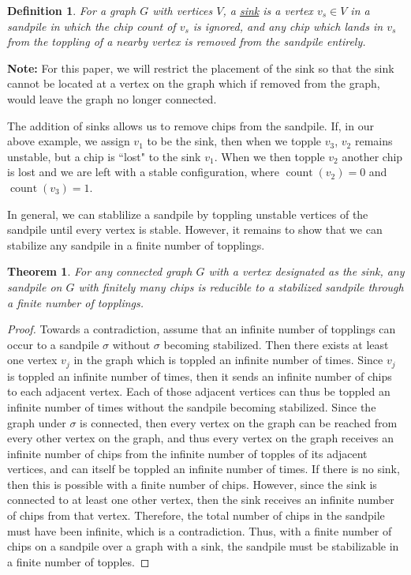 \documentclass[12pt]{article}
\DeclareMathOperator{\ct}{count}
\newtheorem{theorem}{Theorem}
\newtheorem{definition}{Definition}
\begin{document}
\begin{definition}
    For a graph $G$ with vertices $V$, a \underline{sink} is a vertex $v_s \in V$ in a sandpile in which the chip count of $v_s$ is ignored, and any chip which lands in $v_s$ from the toppling of a nearby vertex is removed from the sandpile entirely.
\end{definition}

\textbf{Note:}  For this paper, we will restrict the placement of the sink so that the sink cannot be located at a vertex on the graph which if removed from the graph, would leave the graph no longer connected.  %

The addition of sinks allows us to remove chips from the sandpile.  If, in our above example, we assign $v_1$ to be the sink, then when we topple $v_3$, $v_2$ remains unstable, but a chip is ``lost" to the sink $v_1$.  When we then topple $v_2$ another chip is lost and we are left with a stable configuration, where $\ct(v_2)=0$ and $\ct(v_3)=1$.

In general, we can stablilize a sandpile by toppling unstable vertices of the sandpile until every vertex is stable.  However, it remains to show that we can stabilize any sandpile in a finite number of topplings.

\begin{theorem} \label{thm:finite}
    For any connected graph $G$ with a vertex designated as the sink, any sandpile on $G$ with finitely many chips is reducible to a stabilized sandpile through a finite number of topplings.
\end{theorem}
\begin{proof}
    Towards a contradiction, assume that an infinite number of topplings can occur to a sandpile $\sigma$ without $\sigma$ becoming stabilized.  Then there exists at least one vertex $v_j$ in the graph which is toppled an infinite number of times.  Since $v_j$ is toppled an infinite number of times, then it sends an infinite number of chips to each adjacent vertex.  Each of those adjacent vertices can thus be toppled an infinite number of times without the sandpile becoming stabilized.  Since the graph under $\sigma$ is connected, then every vertex on the graph can be reached from every other vertex on the graph, and thus every vertex on the graph receives an infinite number of chips from the infinite number of topples of its adjacent vertices, and can itself be toppled an infinite number of times.  If there is no sink, then this is possible with a finite number of chips.  However, since the sink is connected to at least one other vertex, then the sink receives an infinite number of chips from that vertex.  Therefore, the total number of chips in the sandpile must have been infinite, which is a contradiction.  Thus, with a finite number of chips on a sandpile over a graph with a sink, the sandpile must be stabilizable in a finite number of topples.
\end{proof}
\end{document}
